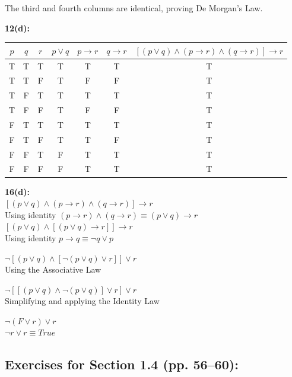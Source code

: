 \documentclass[12pt]{article}  %
\newcommand{\NOT}{\neg}
\newcommand{\AND}{\wedge}
\newcommand{\OR}{\vee}
\newcommand{\IMPLIES}{\rightarrow}
\newcommand{\EQUIV}{\equiv}
\begin{document}
\noindent
The third and fourth columns are identical, proving De Morgan's Law.

\noindent
{\bf 12(d):}

\begin{tabular}{|c|c|c|c|c|c|c|}
\hline
$p$ & $q$ & $r$ & $p \OR q$ & $p \IMPLIES r$ & $q \IMPLIES r$ & $ [(p \OR q) \AND (p \IMPLIES r) \AND (q \IMPLIES r)] \IMPLIES r$ \\
\hline
\hline
T & T & T & T & T & T & T\\
\hline
T & T & F & T & F & F & T\\
\hline
T & F & T & T & T & T & T\\
\hline
T & F & F & T & F & F & T\\
\hline
F & T & T & T & T & T & T\\
\hline
F & T & F & T & T & F & T\\
\hline
F & F & T & F & T & T & T\\
\hline
F & F & F & F & T & T & T\\
\hline
\end{tabular}

\noindent
{\bf 16(d):}
\\
\indent
$ [(p \OR q) \AND (p \IMPLIES r) \AND (q \IMPLIES r)] \IMPLIES r$ \\

Using identity $(p \IMPLIES r) \AND (q \IMPLIES r) \EQUIV (p \OR q) \IMPLIES r $ \\

$[(p \OR q) \AND [(p \OR q) \IMPLIES r]] \IMPLIES r$\\

Using identity $p \IMPLIES q \EQUIV \NOT q \OR p$

$ \NOT [(p \OR q) \AND [\NOT(p \OR q) \OR r]] \OR r$ \\

Using the Associative Law

$ \NOT [[(p \OR q) \AND \NOT (p \OR q)] \OR r] \OR r $\\

Simplifying and applying the Identity Law

$ \NOT(F \OR r) \OR r$ \\
\indent
$ \NOT r \OR r \EQUIV True $



\subsection*{Exercises for Section 1.4 (pp. 56--60):}     
\end{document}
